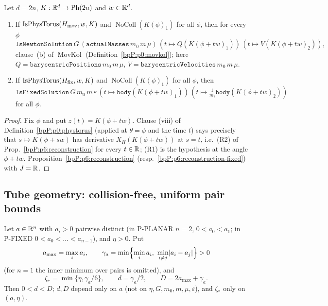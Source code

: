 \begin{corollary}\label{bpP:p6:orbit-transfer}
Let $d=2n$, $K:\mathbb{R}^d\to\mathrm{Ph}(2n)$ and $w\in\mathbb{R}^d$.
\begin{enumerate}[label=(\alph*)]
\item If $\operatorname{IsPhysTorus}(H_{\rm mov},w,K)$ and $\operatorname{NoColl}(K(\phi)_1)$ for all $\phi$, then for every $\phi$
\[\texttt{IsNewtonSolution}\,G\,(\texttt{actualMasses}\,m_0\,m\,\mu)\,(t\mapsto Q(K(\phi+tw)_1))\,(t\mapsto V(K(\phi+tw)_2)),\]
clause~(b) of $\operatorname{MovKol}$ (Definition~\ref{bpP:p0:movkol}); here $Q=\texttt{barycentricPositions}\,m_0\,m\,\mu$, $V=\texttt{barycentricVelocities}\,m_0\,m\,\mu$.
\item If $\operatorname{IsPhysTorus}(H_{\rm fix},w,K)$ and $\operatorname{NoColl}(K(\phi)_1)$ for all $\phi$, then $\texttt{IsFixedSolution}\,G\,m_0\,m\,\varepsilon\,(t\mapsto\texttt{body}(K(\phi+tw)_1))\,(t\mapsto\frac1{m_i}\texttt{body}(K(\phi+tw)_2))$ for all $\phi$.
\end{enumerate}
\end{corollary}
\begin{proof}
\label{stepP:p6:ot-curve} Fix $\phi$ and put $z(t)=K(\phi+tw)$. Clause (viii) of Definition~\ref{bpP:p0:phystorus} (applied at $\theta=\phi$ and the time $t$) says precisely that $s\mapsto K(\phi+sw)$ has derivative $X_H(K(\phi+tw))$ at $s=t$, i.e.\ (R2) of Prop.~\ref{bpP:p6:reconstruction} for every $t\in\mathbb{R}$; (R1) is the hypothesis at the angle $\phi+tw$.
\label{stepP:p6:ot-apply} Proposition~\ref{bpP:p6:reconstruction} (resp.~\ref{bpP:p6:reconstruction-fixed}) with $J=\mathbb{R}$.
\end{proof}

\subsection{Tube geometry: collision-free, uniform pair bounds}\label{bpP:p6:tube}

\begin{definition}\label{bpP:p6:tube-constants}
Let $a\in\mathbb{R}^n$ with $a_i>0$ pairwise distinct (in P-PLANAR $n=2$, $0<a_0<a_1$; in P-FIXED $0<a_0<\dots<a_{n-1}$), and $\eta>0$. Put
\[a_{\max}=\max_ia_i,\qquad\gamma_a=\min\Bigl\{\min_ia_i,\ \min_{i\ne j}\abs{a_i-a_j}\Bigr\}>0\]
(for $n=1$ the inner minimum over pairs is omitted), and
\[\zeta_*=\min\{\eta,\gamma_a/6\},\qquad d=\gamma_a/2,\qquad D=2a_{\max}+\gamma_a.\]
Then $0<d<D$; $d,D$ depend only on $a$ (not on $\eta,G,m_0,m,\mu,\varepsilon$), and $\zeta_*$ only on $(a,\eta)$.
\end{definition}

